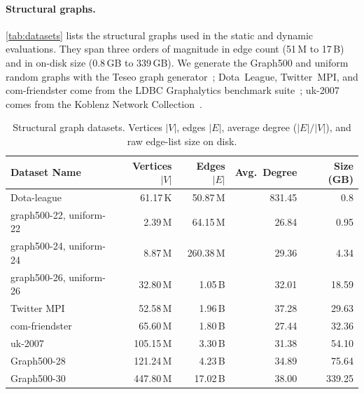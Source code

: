 \paragraph{Structural graphs.}
\autoref{tab:datasets} lists the structural graphs used in the static and dynamic evaluations.
They span three orders of magnitude in edge count (51\,M to 17\,B) and in on-disk size (0.8\,GB to 339\,GB).
We generate the Graph500 and uniform random graphs with the Teseo graph generator~\cite{teseo2021deLeo}; Dota~League, Twitter~MPI, and com-friendster come from the LDBC Graphalytics benchmark suite~\cite{LDBCGrapalytics22:online}; uk-2007 comes from the Koblenz Network Collection~\cite{kunegis2013konect}.

\begin{table}[h]
  \begin{tabular*}{\columnwidth}{@{\extracolsep{\fill}}lrrrr@{}}
  \toprule
  Dataset Name &
    Vertices $|V|$ &
    Edges $|E|$ &
    Avg.\ Degree &
    Size (GB) \\ \midrule
  Dota-league             & 61.17\,K  & 50.87\,M  & 831.45 & 0.8    \\
  graph500-22, uniform-22 & 2.39\,M   & 64.15\,M  & 26.84  & 0.95   \\
  graph500-24, uniform-24 & 8.87\,M   & 260.38\,M & 29.36  & 4.34   \\
  graph500-26, uniform-26 & 32.80\,M  & 1.05\,B   & 32.01  & 18.59  \\
  Twitter MPI             & 52.58\,M  & 1.96\,B   & 37.28  & 29.63  \\
  com-friendster          & 65.60\,M  & 1.80\,B   & 27.44  & 32.36  \\
  uk-2007                 & 105.15\,M & 3.30\,B   & 31.38  & 54.10  \\
  Graph500-28             & 121.24\,M & 4.23\,B   & 34.89  & 75.64  \\
  Graph500-30             & 447.80\,M & 17.02\,B  & 38.00  & 339.25 \\ \bottomrule
  \end{tabular*}
  \caption{Structural graph datasets.
    Vertices $|V|$, edges $|E|$, average degree ($|E|/|V|$), and raw
    edge-list size on disk.}
  \label{tab:datasets}
  \end{table}

